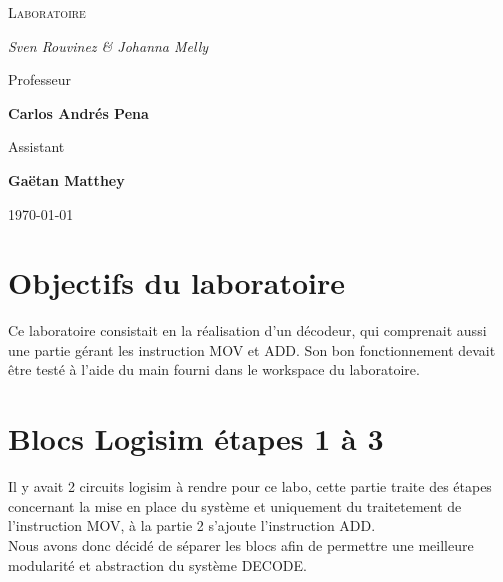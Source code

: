 \documentclass[a4paper]{article} %
\begin{document}
\renewcommand{\labelitemi}{$\bullet$}
\renewcommand{\labelitemii}{$\cdot$}
\renewcommand{\labelitemiii}{$\diamond$}
\renewcommand{\labelitemiv}{$\ast$}

\begin{titlepage}
	\centering
	
	{\scshape\LARGE \color{Monokaimagenta} Laboratoire \\  \par}
	
	\vspace{1cm}
	
	{\Large\itshape Sven Rouvinez \& Johanna Melly\par}
	
	\vfill
	Professeur\par
	\textbf{Carlos Andrés Pena} \par%
	\vspace{1cm}
	Assistant\par
	\textbf{Gaëtan Matthey}
	
	\vfill

	{\large \today\par}
	
\end{titlepage}

\section{Objectifs du laboratoire}
Ce laboratoire consistait en la réalisation d'un décodeur, qui comprenait aussi une partie gérant les instruction MOV et ADD. Son bon fonctionnement devait être testé à l'aide du main fourni dans le workspace du laboratoire.

\section{Blocs Logisim étapes 1 à 3}
Il y avait 2 circuits logisim à rendre pour ce labo, cette partie traite des étapes concernant la mise en place du système et uniquement du traitetement de l'instruction MOV, à la partie 2 s'ajoute l'instruction ADD.\\
Nous avons donc décidé de séparer les blocs afin de permettre une meilleure modularité et abstraction du système DECODE.\\
\end{document}
